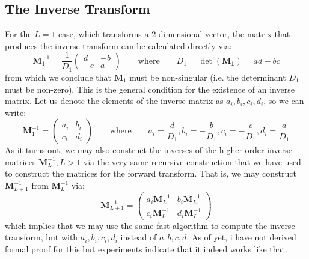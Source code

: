 \subsection{The Inverse Transform}
For the $L = 1$ case, which transforms a $2$-dimensional vector, the matrix that produces the inverse transform can be calculated directly via:
\begin{equation}
 \mathbf{M}_1^{-1} =
 \frac{1}{D_1}
 \begin{pmatrix}
 d  & -b  \\
 -c &  a
 \end{pmatrix} 
 \qquad \text{where} \qquad
 D_1 = \det(\mathbf{M_1}) = a d - b c
\end{equation}
from which we conclude that $\mathbf{M}_1$ must be non-singular (i.e. the determinant $D_1$ must be non-zero). This is the general condition for the existence of an inverse matrix. Let us denote the elements of the inverse matrix as $a_i, b_i, c_i, d_i$, so we can write:
\begin{equation}
 \mathbf{M}_1^{-1} =
 \begin{pmatrix}
 a_i & b_i  \\
 c_i & d_i
 \end{pmatrix} 
 \qquad \text{where} \qquad
 a_i = \frac{d}{D_1}, b_i = -\frac{b}{D_1}, c_i = -\frac{c}{D_1}, d_i = \frac{a}{D_1}
\end{equation}
As it turns out, we may also construct the inverses of the higher-order inverse matrices $\mathbf{M}_L^{-1}, L > 1$ via the very same recursive construction that we have used to construct the matrices for the forward transform. That is, we may construct $\mathbf{M}_{L+1}^{-1}$ from  $\mathbf{M}_{L}^{-1}$ via:
\begin{equation}
 \mathbf{M}_{L+1}^{-1} =
 \begin{pmatrix}
 a_i \mathbf{M}_L^{-1} &  b_i \mathbf{M}_L^{-1}  \\
 c_i \mathbf{M}_L^{-1} &  d_i \mathbf{M}_L^{-1}
 \end{pmatrix}
\end{equation}
which implies that we may use the same fast algorithm to compute the inverse transform, but with $a_i, b_i, c_i, d_i$ instead of $a, b ,c, d$. As of yet, i have not derived formal proof for this but experiments indicate that it indeed works like that.

